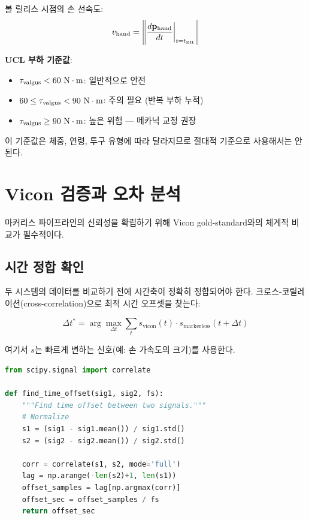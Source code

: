 \documentclass[11pt, a4paper]{report}
\begin{document}
볼 릴리스 시점의 손 선속도:
\begin{equation}
  v_{\text{hand}} = \left\|\frac{d\mathbf{p}_{\text{hand}}}{dt}\bigg|_{t=t_{\text{BR}}}\right\|
\end{equation}

\begin{injurybox}
\textbf{UCL 부하 기준값}:
\begin{itemize}[nosep]
  \item $\tau_{\text{valgus}} < 60\,\,\text{N}\cdot\text{m}$: 일반적으로 안전
  \item $60 \leq \tau_{\text{valgus}} < 90\,\,\text{N}\cdot\text{m}$: 주의 필요 (반복 부하 누적)
  \item $\tau_{\text{valgus}} \geq 90\,\,\text{N}\cdot\text{m}$: 높은 위험 --- 메카닉 교정 권장
\end{itemize}
이 기준값은 체중, 연령, 투구 유형에 따라 달라지므로 절대적 기준으로 사용해서는 안 된다.
\end{injurybox}


\chapter{Vicon 검증과 오차 분석}

마커리스 파이프라인의 신뢰성을 확립하기 위해 Vicon gold-standard와의 체계적 비교가 필수적이다.

\section{시간 정합 확인}

두 시스템의 데이터를 비교하기 전에 시간축이 정확히 정합되어야 한다.
크로스-코릴레이션(cross-correlation)으로 최적 시간 오프셋을 찾는다:

\begin{equation}
  \Delta t^* = \arg\max_{\Delta t} \sum_{t} s_{\text{vicon}}(t) \cdot s_{\text{markerless}}(t + \Delta t)
\end{equation}

여기서 $s$는 빠르게 변하는 신호(예: 손 가속도의 크기)를 사용한다.

\begin{codebox}[title={크로스-코릴레이션 시간 정합}]
\begin{lstlisting}[language=Python]
from scipy.signal import correlate

def find_time_offset(sig1, sig2, fs):
    """Find time offset between two signals."""
    # Normalize
    s1 = (sig1 - sig1.mean()) / sig1.std()
    s2 = (sig2 - sig2.mean()) / sig2.std()

    corr = correlate(s1, s2, mode='full')
    lag = np.arange(-len(s2)+1, len(s1))
    offset_samples = lag[np.argmax(corr)]
    offset_sec = offset_samples / fs
    return offset_sec
\end{lstlisting}
\end{codebox}
\end{document}
